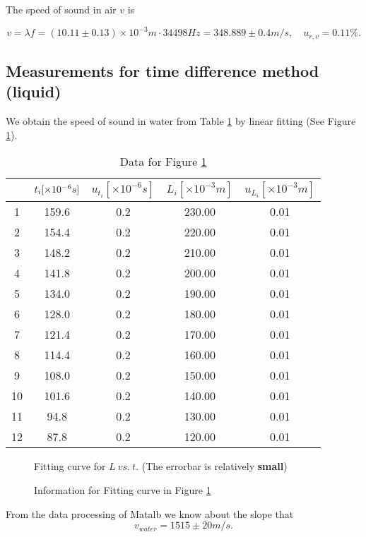 The speed of sound in air $v$ is

\[
    v=\lambda f = (10.11 \pm 0.13) \times 10^{-3} m \cdot 34498 Hz  = 348.889 \pm 0.4 m/s,\quad u_{r,v}=0.11\%.
\]

\subsection{Measurements for time difference method (liquid)}

We obtain the speed of sound in water from Table \ref{data_tim} by linear fitting (See Figure \ref{lt}).
    
\begin{table}[H] \small
    \centering
    \begin{tabular}{|c|c|c|c|c|}
    \hline
        & $t_i[\times 10^{-6}s]$ & $u_{t_i}[\times 10^{-6} s]$ & $L_i[\times 10^{-3} m]$ & $u_{L_i}[\times 10^{-3} m]$\\\hline
        1 & 159.6 & 0.2 & 230.00 & 0.01\\\hline
        2 & 154.4 & 0.2 & 220.00 & 0.01\\\hline
        3 & 148.2 & 0.2 & 210.00 & 0.01\\\hline
        4 & 141.8 & 0.2 & 200.00 & 0.01\\\hline
        5 & 134.0 & 0.2 & 190.00 & 0.01\\\hline
        6 & 128.0 & 0.2 & 180.00 & 0.01\\\hline
        7 & 121.4 & 0.2 & 170.00 & 0.01\\\hline
        8 & 114.4 & 0.2 & 160.00 & 0.01\\\hline
        9 & 108.0 & 0.2 & 150.00 & 0.01\\\hline
        10 & 101.6 & 0.2 & 140.00 & 0.01\\\hline
        11 & 94.8 & 0.2 & 130.00 & 0.01\\\hline
        12 & 87.8 & 0.2 & 120.00 & 0.01\\\hline
    \end{tabular}
    \caption{Data for Figure \ref{lt}}\label{data_tim}
\end{table}
\begin{figure}[H]
    \centering
    \caption{Fitting curve for $L\ vs.\ t$. (The errorbar is relatively \textbf{small})}\label{lt}
\end{figure}
\begin{figure}[H]
    \centering
    \caption{Information for Fitting curve in Figure \ref{lt}}\label{ltinfo}
\end{figure}

From the data processing of Matalb we know about the slope that 
\[
    v_{water}=1515\pm20m/s.
\]